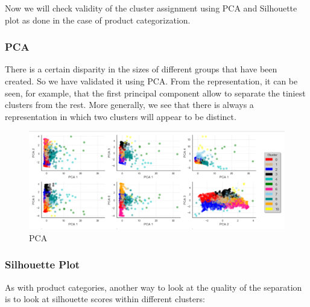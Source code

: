 Now we will check validity of the cluster assignment using PCA and Silhouette plot as done in the case of product categorization.\\

\subsubsection{\textbf{PCA}}

There is a certain disparity in the sizes of different groups that have been created. So we have validated it using PCA. From the representation, it can be seen, for example, that the first principal component allow to separate the tiniest clusters from the rest. More generally, we see that there is always a representation in which two clusters will appear to be distinct.\\


\begin{figure}[H]
\caption{PCA}
\label{4.4}
\centering
\includegraphics[width=\columnwidth]{images/4_4.PNG}
\end{figure}

\subsubsection{\textbf{Silhouette Plot}}

As with product categories, another way to look at the quality of the separation is to look at silhouette scores within different clusters:\\

